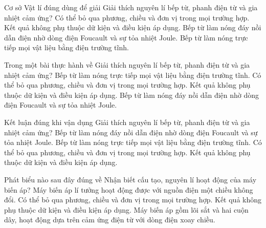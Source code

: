 \begin{ex}
Cơ sở Vật lí đúng dùng để giải Giải thích nguyên lí bếp từ, phanh điện từ và gia nhiệt cảm ứng?
\choice
{Có thể bỏ qua phương, chiều và đơn vị trong mọi trường hợp.}
{Kết quả không phụ thuộc dữ kiện và điều kiện áp dụng.}
{\True Bếp từ làm nóng đáy nồi dẫn điện nhờ dòng điện Foucault và sự tỏa nhiệt Joule.}
{Bếp từ làm nóng trực tiếp mọi vật liệu bằng điện trường tĩnh.}
\end{ex}

\begin{ex}
Trong một bài thực hành về Giải thích nguyên lí bếp từ, phanh điện từ và gia nhiệt cảm ứng?
\choice
{Bếp từ làm nóng trực tiếp mọi vật liệu bằng điện trường tĩnh.}
{Có thể bỏ qua phương, chiều và đơn vị trong mọi trường hợp.}
{Kết quả không phụ thuộc dữ kiện và điều kiện áp dụng.}
{\True Bếp từ làm nóng đáy nồi dẫn điện nhờ dòng điện Foucault và sự tỏa nhiệt Joule.}
\end{ex}

\begin{ex}
Kết luận đúng khi vận dụng Giải thích nguyên lí bếp từ, phanh điện từ và gia nhiệt cảm ứng?
\choice
{\True Bếp từ làm nóng đáy nồi dẫn điện nhờ dòng điện Foucault và sự tỏa nhiệt Joule.}
{Bếp từ làm nóng trực tiếp mọi vật liệu bằng điện trường tĩnh.}
{Có thể bỏ qua phương, chiều và đơn vị trong mọi trường hợp.}
{Kết quả không phụ thuộc dữ kiện và điều kiện áp dụng.}
\end{ex}

\begin{ex}
Phát biểu nào sau đây đúng về Nhận biết cấu tạo, nguyên lí hoạt động của máy biến áp?
\choice
{Máy biến áp lí tưởng hoạt động được với nguồn điện một chiều không đổi.}
{Có thể bỏ qua phương, chiều và đơn vị trong mọi trường hợp.}
{Kết quả không phụ thuộc dữ kiện và điều kiện áp dụng.}
{\True Máy biến áp gồm lõi sắt và hai cuộn dây, hoạt động dựa trên cảm ứng điện từ với dòng điện xoay chiều.}
\end{ex}

